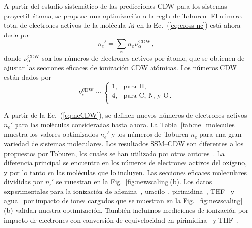 A partir del estudio sistemático de las predicciones CDW para los 
sistemas proyectil--átomo, se propone una optimización a la regla de 
Toburen. El número total de electrones activos de la molécula $M$ en la 
Ec.~(\ref{eq:cross-ne}) está ahora dado por 
\begin{equation}
n_e'=\sum_{\alpha}n_{\alpha}\nu_{\alpha}^{\text{CDW}}\,,
\label{eq:neprima}
\end{equation}
donde $\nu_{\alpha}^{\text{CDW}}$ son los números de electrones activos 
por átomo, que se obtienen de ajustar las secciones eficaces de 
ionización CDW atómicas. Los números CDW están dados por
\begin{equation}
\nu_{\alpha }^{\text{CDW}} \sim\left\{ 
\begin{array}{ll}
1, & \text{para H,} \\
4, & \text{para C, N, y O}\,. \\ 
\end{array}
\right. 
\label{eq:neCDW}
\end{equation}

A partir de la Ec.~(\ref{eq:neCDW}), se definen nuevos números de 
electrones activos $n_e'$ para las moléculas consideradas hasta ahora.  
La Tabla~\ref{tab:ne_molecules} muestra los valores optimizados $n_e'$ y 
los números de Toburen $n_e$ para una gran variedad de sistemas 
moleculares. Los resultados SSM--CDW son diferentes a los propuestos por 
Toburen, los cuales se han utilizado por otros autores~\cite{itoh2013}. 
La diferencia principal se encuentra en los números de electrones 
activos del oxígeno, y por lo tanto en las moléculas que lo incluyen. 
Las secciones eficaces moleculares divididas por $n_e'$ se muestran en 
la Fig.~\ref{fig:newscaling}(b). Los datos experimentales para la 
ionización de adenina~\cite{Iriki:11,Sens:20,Bhattacharjee:19}, 
uracilo~\cite{itoh2013,Sens:20}, pirimidina~\cite{wolff2014}, 
THF~\cite{wang2016} y agua~\cite{Luna2007,Bolorizadeh86,H_Rudd85,
toburen80,Ohsawa05,He_Rudd85,DalCappello:09,Bhattacharjee:17,
Bhattacharjee:16} por impacto de iones cargados que se muestran en la 
Fig.~\ref{fig:newscaling}(b) validan nuestra optimización. También 
incluimos mediciones de ionización por impacto de electrones con 
conversión de equivelocidad en pirimidina~\cite{bug2017} y 
THF~\cite{bug2017,wolf2019,fuss2009}. 


